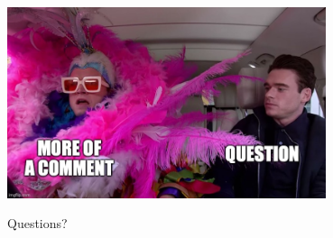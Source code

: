 \documentclass[10pt,aspectratio=169]{beamer}
\begin{document}
\begin{frame}{}
    \centering
    \includegraphics[width=0.7\textwidth]{figures/meme_more-of-a-comment.jpg}
    \huge{\centerline{Questions?}}
\end{frame}
\end{document}

